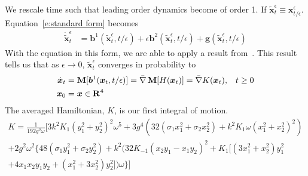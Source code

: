 We rescale time such that leading order dynamics become of order
1. If $\tilde{\boldsymbol{x}}_t^{\epsilon} \equiv
\boldsymbol{x}_{t/\epsilon}^{\epsilon}$. Equation~\eqref{e:standard
form} becomes
\begin{align*}
\dot{\tilde{\boldsymbol{x}}}^{\epsilon}_t& = \boldsymbol{b}^1
({\tilde{\boldsymbol{x}}}^{\epsilon}_t,t/\epsilon) + \epsilon
\boldsymbol{b}^2
({\tilde{\boldsymbol{x}}}^{\epsilon}_t,t/\epsilon) +
\boldsymbol{g} (\tilde{\boldsymbol{x}}^{\epsilon}_t,t/\epsilon)
\end{align*}
With the equation in this form, we are able to apply a result from~\citet{khas'minskii66:_stoch_proc}. This result tells us that as $\epsilon \to 0$, $\tilde{\boldsymbol{x}}_t^\epsilon$ converges in probability to
\begin{align*}
\dot{\boldsymbol{x}}_t &= \operatorname{\mathbf M}[\boldsymbol{b}^1(\boldsymbol{x}_t,t/\epsilon)] = \bar{\nabla}\operatorname{\mathbf M}[H(\boldsymbol{x}_t)] = \bar{\nabla} K(\boldsymbol{x}_t), & t \geq 0\\
\boldsymbol{x}_0 &= \boldsymbol x \in \mathbf R^4
\end{align*}
The averaged Hamiltonian, $K$, is our first integral of motion.
\begin{multline*}
K =\frac{1}{192 g^3 \omega}\bigl[3 k^2 K_1 (y_1^2+y_2^2)^2
\omega^5 + 3g^4 (32(\sigma_1 x_1^2 + \sigma_2 x_2^2)+k^2 K_1 \omega
(x_1^2+x_2^2)^2)\\
+ 2g^2 \omega^2 \{48(\sigma_1 y_1^2 + \sigma_2 y_2^2) + k^2 (32 K_{-1}
(x_2 y_1-x_1 y_2)^2+K_1[(3 x_1^2+x_2^2) y_1^2 \\
+ 4 x_1 x_2 y_1 y_2 + (x_1^2 + 3 x_2^2) y_2^2])\omega\}\bigr]
\end{multline*}

